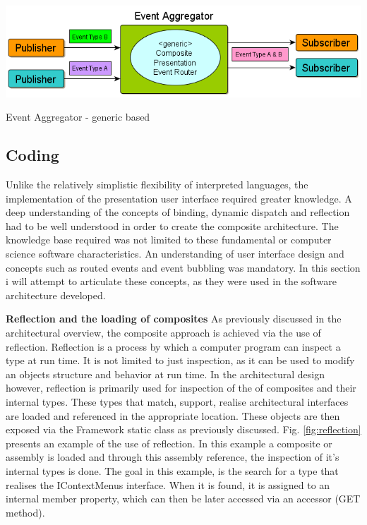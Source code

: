 		\begin{figurehere}
			\centering
			\includegraphics[scale=0.62]{pages/chapter3/figures/eag.png}
			\caption{Event Aggregator - generic based}
			\label{fig:EventAggregatorGenericBased}
		\end{figurehere}
		
\newpage
	
	\subsection{Coding} 
		\label{sec:LGPAdminCoding}
			
			
		\normalsize
		{		
			Unlike the relatively simplistic flexibility of interpreted languages, the implementation of the presentation user interface required
			greater knowledge.  A deep understanding of the concepts of binding, dynamic dispatch and reflection had to be well understood in order
			to create the composite architecture.
			The knowledge base required was not limited to these fundamental or computer science software characteristics.
			An understanding of user interface design and concepts such as routed events and event bubbling was mandatory.
			\newline
			\newline
			In this section i will attempt to articulate these concepts, as they were used in the software architecture developed.
			\newline
		}
		
		\large{\bfseries{Reflection and the loading of composites}}
		\newline
		\normalsize
		{
			As previously discussed in the architectural overview, the composite approach is achieved via the use of reflection.  
			Reflection is a process by which a computer program can inspect a type at run time.  It is not limited to just inspection,
			as it can be used to modify an objects structure and behavior at run time.  In the architectural design however, reflection is 
			primarily used for inspection of the of composites and their internal types.  These types that match, support, realise architectural interfaces
			are loaded and referenced in the appropriate location.  These objects are then exposed via the Framework static class as previously discussed.
			\newline
			\newline
			Fig. \ref{fig:reflection} presents an example of the use of reflection.  In this example a composite or assembly is loaded and
			through this assembly reference, the inspection of it's internal types is done.
			The goal in this example, is the search for a type that realises the IContextMenus interface.  When it is found, it is assigned to 
			an internal member property, which can then be later accessed via an accessor (GET method).
			\newline
		}
		
